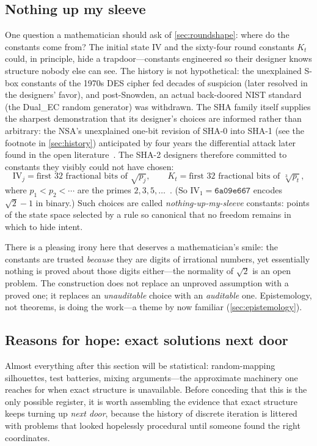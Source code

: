 \subsection{Nothing up my sleeve}\label{sec:nums}

One question a mathematician should ask of \cref{sec:roundshape}: where do
the constants come from? The initial state $\mathrm{IV}$ and the sixty-four
round constants $K_t$ could, in principle, hide a trapdoor---constants
engineered so their designer knows structure nobody else can see. The
history is not hypothetical: the unexplained S-box constants of the 1970s
DES cipher fed decades of suspicion (later resolved in the designers'
favor), and post-Snowden, an actual back-doored NIST standard (the
Dual\_EC random generator) was withdrawn. The SHA family itself supplies
the sharpest demonstration that its designer's choices are informed
rather than arbitrary: the NSA's unexplained one-bit revision of SHA-0
into SHA-1 (see the footnote in \cref{sec:history}) anticipated by four
years the differential attack later found in the open
literature~\citep{ChabaudJoux1998}. The SHA-2 designers therefore
committed to constants they visibly could not have chosen:
\[
  \mathrm{IV}_j = \text{first 32 fractional bits of } \sqrt{p_j},
  \qquad
  K_t = \text{first 32 fractional bits of } \sqrt[3]{p_t},
\]
where $p_1 < p_2 < \cdots$ are the primes $2, 3, 5, \dots$~\citep{FIPS180-4}.
(So $\mathrm{IV}_1 = \mathtt{6a09e667}$ encodes $\sqrt{2}-1$ in binary.)
Such choices are called \emph{nothing-up-my-sleeve} constants: points of
the state space selected by a rule so canonical that no freedom remains in
which to hide intent.

There is a pleasing irony here that deserves a mathematician's smile: the
constants are trusted \emph{because} they are digits of irrational
numbers, yet essentially nothing is proved about those digits either---the
normality of $\sqrt{2}$ is an open problem. The construction does not
replace an unproved assumption with a proved one; it replaces an
\emph{unauditable} choice with an \emph{auditable} one. Epistemology, not
theorems, is doing the work---a theme by now familiar
(\cref{sec:epistemology}).

\subsection{Reasons for hope: exact solutions next door}\label{sec:hope}

Almost everything after this section will be statistical:
random-mapping silhouettes, test batteries, mixing arguments---the
approximate machinery one reaches for when exact structure is
unavailable. Before conceding that this is the only possible register,
it is worth assembling the evidence that exact structure keeps turning
up \emph{next door}, because the history of discrete iteration is
littered with problems that looked hopelessly procedural until someone
found the right coordinates.

